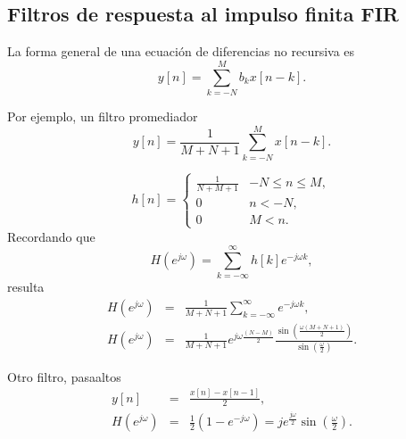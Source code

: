 \subsection{Filtros de respuesta al impulso finita \textbf{FIR}}

La forma general de una ecuaci\'{o}n de diferencias no recursiva es 
\begin{equation}
        y\left[ n\right] =\sum_{k=-N}^{M}b_{k}x\left[ n-k\right].
\end{equation}

Por ejemplo, un filtro promediador 
\begin{equation}
        y\left[ n\right] =\frac{1}{M+N+1}\sum_{k=-N}^{M}x\left[ n-k\right] .
\end{equation}

\begin{equation}
        h\left[ n\right] =      \left\{ 
                                \begin{array}{ll}
                                        \frac{1}{N+M+1} & -N\leq n\leq M, \\ 
                                        0 & n<-N, \\ 
                                        0 & M<n.
                                \end{array}
                                \right.
\end{equation}
Recordando que 
\begin{equation}
        H\left( e^{j\omega }\right) =\sum_{k=-\infty }^{\infty }h\left[ k\right]
e^{-j\omega k},
\end{equation}
resulta 
\begin{eqnarray}
       H\left( e^{j\omega }\right) &=&\frac{1}{M+N+1}\sum_{k=-\infty }^{\infty}e^{-j\omega k}, \\
       H\left( e^{j\omega }\right) &=&
   \frac{1}{M+N+1}e^{j\omega \frac{\left(N-M\right) }{2}}
   \frac{\sin \left( \frac{\omega \left( M+N+1\right) }{2}\right) }{\sin \left( \frac{\omega }{2}\right) }.
\end{eqnarray}

Otro filtro, pasaaltos 
\begin{eqnarray}
      y\left[ n\right]                &=&\frac{x\left[ n\right] -x\left[ n-1\right] }{2}, \\
      H\left( e^{j\omega }\right)     &=&\frac{1}{2}\left( 1-e^{-j\omega }\right) =
                                             je^{\frac{j\omega }{2}}\sin \left( \frac{\omega }{2}\right) .
\end{eqnarray}

